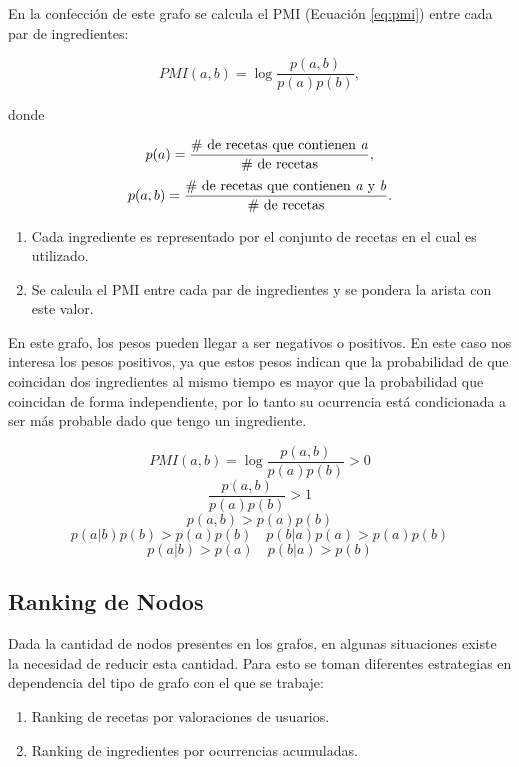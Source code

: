 \documentclass[
	a4paper, %
	10pt, %
	unnumberedsections, %
	twoside, %
]{LTJournalArticle}
\begin{document}
En la confección de este grafo se calcula el PMI \autocite{teng2012recipe} (Ecuación \ref{eq:pmi}) entre cada par de ingredientes:

\begin{equation}
	PMI(a, b) = \log \frac{p(a,b)}{p(a)p(b)},
	\label{eq:pmi}
\end{equation}

donde

\begin{equation*}
	p(a) = \frac{\text{\# de recetas que contienen \textit{a}}}{\text{\# de recetas}},
\end{equation*}
\begin{equation*}
	p(a,b) = \frac{\text{\# de recetas que contienen \textit{a} y \textit{b}}}{\text{\# de recetas}}.
\end{equation*}

\begin{enumerate}
	\item Cada ingrediente es representado por el conjunto de recetas en el cual es utilizado.
	\item Se calcula el PMI entre cada par de ingredientes y se pondera la arista con este valor.
\end{enumerate}

En este grafo, los pesos pueden llegar a ser negativos o positivos. En este caso nos interesa los pesos positivos,
ya que estos pesos indican que la probabilidad de que coincidan dos ingredientes al mismo tiempo es mayor que la
probabilidad que coincidan de forma independiente, por lo tanto su ocurrencia está condicionada a ser más probable
dado que tengo un ingrediente.

$$
PMI(a,b) = \log \frac{p(a,b)}{p(a)p(b)} > 0
$$
$$
\frac{p(a,b)}{p(a)p(b)} > 1
$$
$$
p(a,b) > p(a)p(b)
$$
$$
p(a|b)p(b) > p(a)p(b) \quad p(b|a)p(a) > p(a)p(b)
$$
$$
p(a|b) > p(a) \quad p(b|a) > p(b)
$$
	
\subsection{Ranking de Nodos}

Dada la cantidad de nodos presentes en los grafos, en algunas situaciones existe la necesidad de reducir esta
cantidad. Para esto se toman diferentes estrategias en dependencia del tipo de grafo con el que se trabaje:

\begin{enumerate}
	\item Ranking de recetas por valoraciones de usuarios.
	\item Ranking de ingredientes por ocurrencias acumuladas.
\end{enumerate}
\end{document}
